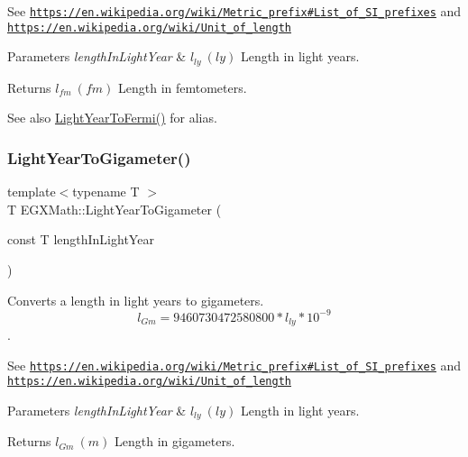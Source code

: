 See \href{https://en.wikipedia.org/wiki/Metric_prefix#List_of_SI_prefixes}{\tt https\+://en.\+wikipedia.\+org/wiki/\+Metric\+\_\+prefix\#\+List\+\_\+of\+\_\+\+S\+I\+\_\+prefixes} and \href{https://en.wikipedia.org/wiki/Unit_of_length}{\tt https\+://en.\+wikipedia.\+org/wiki/\+Unit\+\_\+of\+\_\+length} 
\begin{DoxyParams}{Parameters}
{\em length\+In\+Light\+Year} & $ l_{ly}\ (ly)$ Length in light years. \\
\hline
\end{DoxyParams}
\begin{DoxyReturn}{Returns}
$ l_{fm}\ (fm)$ Length in femtometers. 
\end{DoxyReturn}
\begin{DoxySeeAlso}{See also}
\mbox{\hyperlink{group___e_g_x_math-_conversions-_length_conversions-_astronomical-_light_year-_non-_s_i_gaf3a2acd1e1653e2cecd6c299abe78524}{Light\+Year\+To\+Fermi()}} for alias. 
\end{DoxySeeAlso}
\mbox{\label{group___e_g_x_math-_conversions-_length_conversions-_astronomical-_light_year-_s_i_ga66a1da0c523d43d8e60c911e92703e97}} 
\subsubsection{\texorpdfstring{Light\+Year\+To\+Gigameter()}{LightYearToGigameter()}}
{\footnotesize\ttfamily template$<$typename T $>$ \\
T E\+G\+X\+Math\+::\+Light\+Year\+To\+Gigameter (\begin{DoxyParamCaption}\item[{const T}]{length\+In\+Light\+Year }\end{DoxyParamCaption})}



Converts a length in light years to gigameters. \[ l_{Gm}=9460730472580800 * l_{ly} * 10^{-9} \]. 

See \href{https://en.wikipedia.org/wiki/Metric_prefix#List_of_SI_prefixes}{\tt https\+://en.\+wikipedia.\+org/wiki/\+Metric\+\_\+prefix\#\+List\+\_\+of\+\_\+\+S\+I\+\_\+prefixes} and \href{https://en.wikipedia.org/wiki/Unit_of_length}{\tt https\+://en.\+wikipedia.\+org/wiki/\+Unit\+\_\+of\+\_\+length} 
\begin{DoxyParams}{Parameters}
{\em length\+In\+Light\+Year} & $ l_{ly}\ (ly)$ Length in light years. \\
\hline
\end{DoxyParams}
\begin{DoxyReturn}{Returns}
$ l_{Gm}\ (m)$ Length in gigameters. 
\end{DoxyReturn}
\mbox{\label{group___e_g_x_math-_conversions-_length_conversions-_astronomical-_light_year-_s_i_ga50631edbbd7f5eef1f092138657c725e}} 
